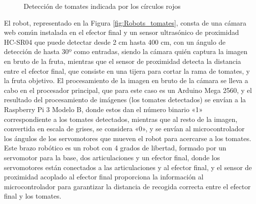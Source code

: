 \begin{figure}[H]
    \begin{center}
      \subcapcentertrue
      \hspace{2mm}
    \end{center}
    \caption{Detección de tomates indicada por los círculos rojos}
    \label{fig:Deteccion_tomates}
  \end{figure}

El robot, representado en la Figura \ref{fig:Robots_tomates}, consta de una cámara web común instalada en el efector final y un sensor ultrasónico de proximidad HC-SR04 que puede detectar desde 2 cm hasta 400 cm, con un ángulo de detección de hasta 30º como entradas, siendo la cámara quién captura la imagen en bruto de la fruta, mientras que el sensor de proximidad detecta la distancia entre el efector final, que consiste en una tijera para cortar la rama de tomates, y la fruta objetivo. El procesamiento de la imagen en bruto de la cámara se lleva a cabo en el procesador principal, que para este caso es un Arduino Mega 2560, y el resultado del procesamiento de imágenes (los tomates detectados) se envían a la Raspberry Pi 3 Modelo B, donde estos dan el número binario «1» correspondiente a los tomates detectados, mientras que al resto de la imagen, convertida en escala de grises, se considera «0», y se envían al microcontrolador los ángulos de los servomotores que mueven el robot para acercarse a los tomates. Este brazo robótico es un robot con 4 grados de libertad, formado por un servomotor para la base, dos articulaciones y un efector final, donde los servomotores están conectados a las articulaciones y al efector final, y el sensor de proximidad acoplado al efector final proporciona la información al microcontrolador para garantizar la distancia de recogida correcta entre el efector final y los tomates.\\


